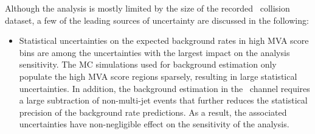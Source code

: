 Although the analysis is mostly limited by the size of the recorded
\pp~collision dataset, a few of the leading sources of uncertainty are discussed
in the following:
\begin{itemize}

\item Statistical uncertainties on the expected background rates in high MVA
  score bins are among the uncertainties with the largest impact on the analysis
  sensitivity. The MC simulations used for background estimation only populate
  the high MVA score regions sparsely, resulting in large statistical
  uncertainties. In addition, the \faketauhadvisC background estimation in the
  \hadhad~channel requires a large subtraction of non-multi-jet events that
  further reduces the statistical precision of the background rate
  predictions. As a result, the associated uncertainties have non-negligible
  effect on the sensitivity of the analysis.





\end{itemize}
